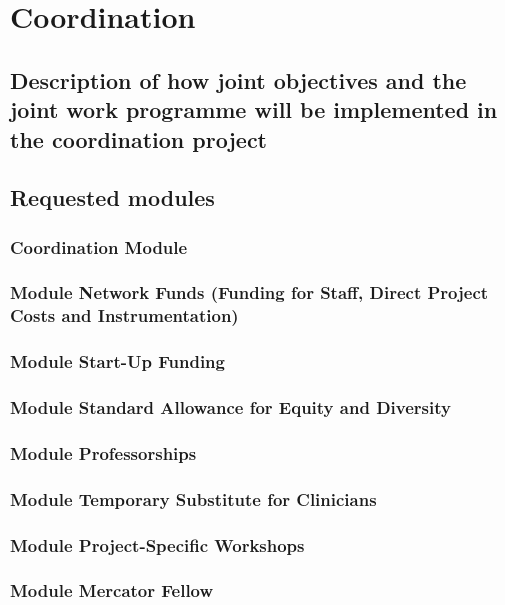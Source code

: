 \documentclass{scrartcl}
\begin{document}
\clearpage
\section{Coordination}

\subsection{Description of how joint objectives and the joint work programme will be implemented in the coordination project}

\subsection{Requested modules}

\subsubsection{Coordination Module}

\subsubsection{Module Network Funds (Funding for Staff, Direct Project Costs and Instrumentation)}

\subsubsection{Module Start-Up Funding}

\subsubsection{Module Standard Allowance for Equity and Diversity}

\subsubsection{Module Professorships}

\subsubsection{Module Temporary Substitute for Clinicians}

\subsubsection{Module Project-Specific Workshops}

\subsubsection{Module Mercator Fellow}
\end{document}
